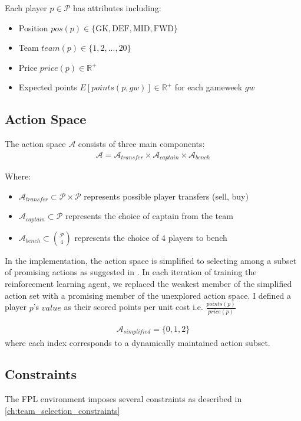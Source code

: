 Each player $p \in \mathcal{P}$ has attributes including:
\begin{itemize}
    \item Position $pos(p) \in \{\text{GK}, \text{DEF}, \text{MID}, \text{FWD}\}$
    \item Team $team(p) \in \{1, 2, ..., 20\}$ 
    \item Price $price(p) \in \mathbb{R}^+$
    \item Expected points $E[points(p, gw)] \in \mathbb{R}^+$ for each gameweek $gw$
\end{itemize}

\subsection{Action Space} \label{action_space}

The action space $\mathcal{A}$ consists of three main components:
\begin{align}
\mathcal{A} = \mathcal{A}_{transfer} \times \mathcal{A}_{captain} \times \mathcal{A}_{bench}
\end{align}

Where:
\begin{itemize}
    \item $\mathcal{A}_{transfer} \subset \mathcal{P} \times \mathcal{P}$ represents possible player transfers (sell, buy)
    \item $\mathcal{A}_{captain} \subset \mathcal{P}$ represents the choice of captain from the team
    \item $\mathcal{A}_{bench} \subset \binom{\mathcal{P}}{4}$ represents the choice of 4 players to bench
\end{itemize}

In the implementation, the action space is simplified to selecting among a subset of promising actions as suggested in \cite{matthews2012}. In each iteration of training the reinforcement learning agent, we replaced the weakest member of the simplified action set with a promising member of the unexplored action space. I defined a player $p$'s $value$ as their scored points per unit cost i.e. $\frac{points(p)}{price(p)}$

\begin{align}
\mathcal{A}_{simplified} = \{0, 1, 2\}
\end{align}
where each index corresponds to a dynamically maintained action subset.

\subsection{Constraints}
The FPL environment imposes several constraints as described in \ref{ch:team_selection_constraints}

